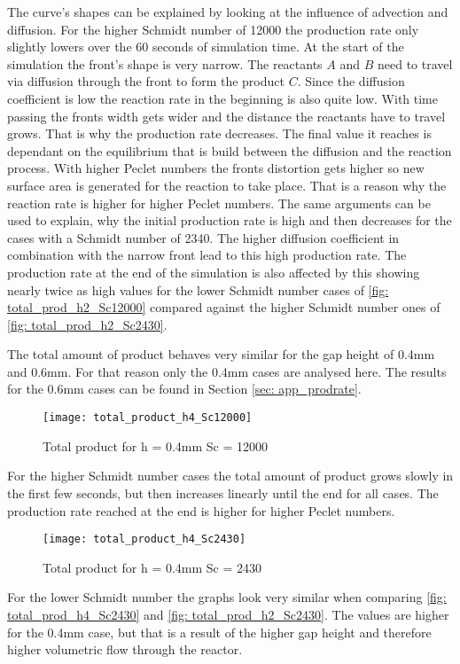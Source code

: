 \documentclass[../thesis.tex]{subfiles}
\begin{document}
The curve's shapes can be explained by looking at the influence of advection and diffusion. For the higher Schmidt number of 12000 the production rate only slightly lowers over the 60 seconds of simulation time. At the start of the simulation the front's shape is very narrow. The reactants $A$ and $B$ need to travel via diffusion through the front to form the product $C$. Since the diffusion coefficient is low the reaction rate in the beginning is also quite low. With time passing the fronts width gets wider and the distance the reactants have to travel grows. That is why the production rate decreases. The final value it reaches is dependant on the equilibrium that is build between the diffusion and the reaction process. With higher Peclet numbers the fronts distortion gets higher so new surface area is generated for the reaction to take place. That is a reason why the reaction rate is higher for higher Peclet numbers.
The same arguments can be used to explain, why the initial production rate is high and then decreases for the cases with a Schmidt number of 2340. The higher diffusion coefficient in combination with the narrow front lead to this high production rate. The production rate at the end of the simulation is also affected by this showing nearly twice as high values for the lower Schmidt number cases of \autoref{fig: total_prod_h2_Sc12000} compared against the higher Schmidt number ones of \autoref{fig: total_prod_h2_Sc2430}.
\newline

The total amount of product behaves very similar for the gap height of 0.4mm and 0.6mm. For that reason only the 0.4mm cases are analysed here. The results for the 0.6mm cases can be found in Section \ref{sec: app_prodrate}.
\begin{figure}[htb]
	\centering
	\texttt{[image: total\_product\_h4\_Sc12000]}
	\caption{Total product for  h = 0.4mm Sc = 12000}
	\label{fig: total_prod_h4_Sc12000}
\end{figure}
For the higher Schmidt number cases the total amount of product grows slowly in the first few seconds, but then increases linearly until the end for all cases. The production rate reached at the end is higher for higher Peclet numbers. 
\begin{figure}[htb]
	\centering
	\texttt{[image: total\_product\_h4\_Sc2430]}
	\caption{Total product for  h = 0.4mm Sc = 2430}
	\label{fig: total_prod_h4_Sc2430}
\end{figure}

For the lower Schmidt number the graphs look very similar when comparing \autoref{fig: total_prod_h4_Sc2430} and \autoref{fig: total_prod_h2_Sc2430}. The values are higher for the 0.4mm case, but that is a result of the higher gap height and therefore higher volumetric flow through the reactor.
\end{document}
